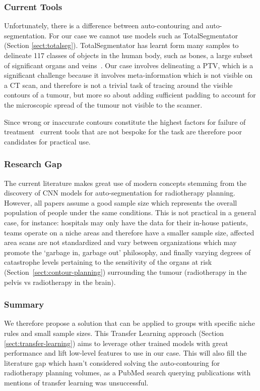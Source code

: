 \documentclass[11pt,twoside]{report}
\begin{document}
\subsubsection{Current Tools}

Unfortunately, there is a difference between auto-contouring and auto-segmentation. For our case we cannot use models such as TotalSegmentator (Section \ref{sect:totalseg}). TotalSegmentator has learnt form many samples to delineate 117 classes of objects in the human body, such as bones, a large subset of significant organs and veins~\cite{totalsegmentor-git}. Our case involves delineating a PTV, which is a significant challenge because it involves meta-information which is not visible on a CT scan, and therefore is not a trivial task of tracing around the visible contours of a tumour, but more so about adding sufficient padding to account for the microscopic spread of the tumour not visible to the scanner.

Since wrong or inaccurate contours constitute the highest factors for failure of treatment~\cite{Rhee2020-ms} current tools that are not bespoke for the task are therefore poor candidates for practical use.

\subsubsection{Research Gap}

The current literature makes great use of modern concepts stemming from the discovery of CNN models for auto-segmentation for radiotherapy planning. However, all papers assume a good sample size which represents the overall population of people under the same conditions. This is not practical in a general case, for instance: hospitals may only have the data for their in-house patients, teams operate on a niche areas and therefore have a smaller sample size, affected area scans are not standardized and vary between organizations which may promote the `garbage in, garbage out' philosophy, and finally varying degrees of catastrophe levels pertaining to the sensitivity of the organs at risk (Section~\ref{sect:contour-planning}) surrounding the tumour (radiotherapy in the pelvis vs radiotherapy in the brain).

\subsubsection{Summary}

We therefore propose a solution that can be applied to groups with specific niche rules and small sample sizes. This Transfer Learning approach (Section \ref{sect:transfer-learning}) aims to leverage other trained models with great performance and lift low-level features to use in our case. This will also fill the literature gap which hasn't considered solving the auto-contouring for radiotherapy planning volumes, as a PubMed search querying publications with mentions of transfer learning was unsuccessful.
\end{document}
